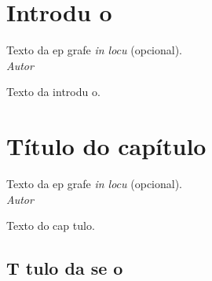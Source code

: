 \documentclass{article}
\begin{document}
\chapter*{Introdu o}

\begin{epigrafeonline}
\hfill Texto da ep grafe \textit{in locu} (opcional).\\
\hspace*{\fill}\textit{Autor}\\
\end{epigrafeonline}

Texto da introdu o.

\nocite{bib:ABNT2011}

\nocite{bib:livro}

\nocite{bib:ebook}

\nocite{bib:tese}

\nocite{bib:dissertacao}

\nocite{bib:monografia}

\nocite{bib:TCC}

\nocite{bib:artigo}

\nocite{bib:proceedings}

\nocite{bib:inproceedings}

\nocite{bib:relatorio}

\nocite{bib:software}

\nocite{bib:software1}

\nocite{bib:inbook}

\nocite{bib:incollection}


\chapter{T\'itulo do cap\'itulo}

\begin{epigrafeonline}
\hfill Texto da ep grafe \textit{in locu} (opcional).\\
\hspace*{\fill}\textit{Autor}\\
\end{epigrafeonline}

Texto do cap tulo.

\section{T tulo da se o}
\end{document}

